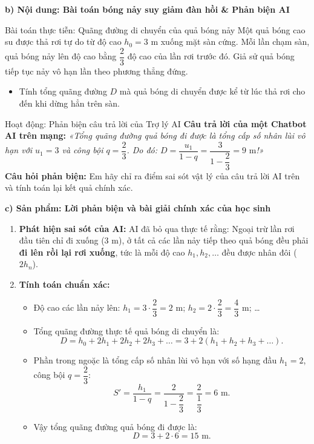 \documentclass[12pt, a4paper]{article}
\begin{document}
\noindent \textbf{b) Nội dung: Bài toán bóng nảy suy giảm đàn hồi \& Phản biện AI}
\begin{pedabox}{Bài toán thực tiễn: Quãng đường di chuyển của quả bóng nảy}
Một quả bóng cao su được thả rơi tự do từ độ cao $h_0 = 3\text{ m}$ xuống mặt sàn cứng. Mỗi lần chạm sàn, quả bóng nảy lên độ cao bằng $\dfrac{2}{3}$ độ cao của lần rơi trước đó. Giả sử quả bóng tiếp tục nảy vô hạn lần theo phương thẳng đứng.
\begin{itemize}[leftmargin=0.6cm]
    \item Tính tổng quãng đường $D$ mà quả bóng di chuyển được kể từ lúc thả rơi cho đến khi dừng hẳn trên sàn.
\end{itemize}
\end{pedabox}

\begin{aibox}{Hoạt động: Phản biện câu trả lời của Trợ lý AI}
\textbf{Câu trả lời của một Chatbot AI trên mạng:}
\textit{«Tổng quãng đường quả bóng đi được là tổng cấp số nhân lùi vô hạn với $u_1 = 3$ và công bội $q = \dfrac{2}{3}$. Do đó: $D = \dfrac{u_1}{1 - q} = \dfrac{3}{1 - \dfrac{2}{3}} = 9\text{ m}$!»}\\
\textbf{Câu hỏi phản biện:} Em hãy chỉ ra điểm sai sót vật lý của câu trả lời AI trên và tính toán lại kết quả chính xác.
\end{aibox}

\noindent \textbf{c) Sản phẩm: Lời phản biện và bài giải chính xác của học sinh}
\begin{enumerate}[leftmargin=0.6cm]
    \item \textbf{Phát hiện sai sót của AI:} AI đã bỏ qua thực tế rằng: Ngoại trừ lần rơi đầu tiên chỉ đi xuống ($3\text{ m}$), ở tất cả các lần nảy tiếp theo quả bóng đều phải \textbf{đi lên rồi lại rơi xuống}, tức là mỗi độ cao $h_1, h_2, \dots$ đều được nhân đôi ($2h_n$).
    \item \textbf{Tính toán chuẩn xác:}
    \begin{itemize}[leftmargin=0.6cm]
        \item Độ cao các lần nảy lên: $h_1 = 3 \cdot \dfrac{2}{3} = 2\text{ m}$; $h_2 = 2 \cdot \dfrac{2}{3} = \dfrac{4}{3}\text{ m}$; \dots
        \item Tổng quãng đường thực tế quả bóng di chuyển là:
        $$D = h_0 + 2h_1 + 2h_2 + 2h_3 + \dots = 3 + 2\left(h_1 + h_2 + h_3 + \dots\right).$$
        \item Phần trong ngoặc là tổng cấp số nhân lùi vô hạn với số hạng đầu $h_1 = 2$, công bội $q = \dfrac{2}{3}$:
        $$S' = \dfrac{h_1}{1 - q} = \dfrac{2}{1 - \dfrac{2}{3}} = \dfrac{2}{\dfrac{1}{3}} = 6\text{ m}.$$
        \item Vậy tổng quãng đường quả bóng đi được là:
        $$D = 3 + 2 \cdot 6 = 15\text{ m}.$$
    \end{itemize}
\end{enumerate}
\end{document}
